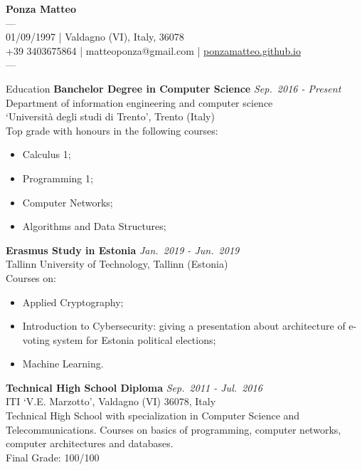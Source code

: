 \documentclass{resume} %
\begin{document}
    {\huge \bf Ponza Matteo}\\
    ---\\
    01/09/1997 | Valdagno (VI), Italy, 36078\\
    +39 3403675864 | matteoponza@gmail.com | \href{https://ponzamatteo.github.io/}{ponzamatteo.github.io}\\
    ---
    \hfill{}\\
\begin{rSection}{Education}
{\bf Banchelor Degree in Computer Science} 
\hfill {\em Sep.~2016 - Present} 
\\ Department of information engineering and computer science
\\ `Università degli studi di Trento', Trento (Italy)
\\ Top grade with honours in the following courses:
\begin{itemize}
\item Calculus 1;
\item Programming 1;
\item Computer Networks;
\item Algorithms and Data Structures;
\end{itemize}


{\bf Erasmus Study in Estonia}
\hfill{\em Jan.~2019 - Jun.~2019} 
\\ Tallinn University of Technology, Tallinn (Estonia)
\\ Courses on:
\begin{itemize}
\item Applied Cryptography;
\item Introduction to Cybersecurity: giving a presentation about architecture of e-voting system for Estonia political elections;
\item Machine Learning.
\end{itemize}

{\bf Technical High School Diploma}
\hfill{\em Sep.~2011 - Jul.~2016} 
\\ ITI ‘V.E. Marzotto’, Valdagno (VI) 36078, Italy
\\ Technical High School with specialization in Computer Science and Telecommunications. Courses on basics of programming, computer networks, computer architectures and databases. 
\\ Final Grade: 100/100

\end{rSection}
\end{document}
